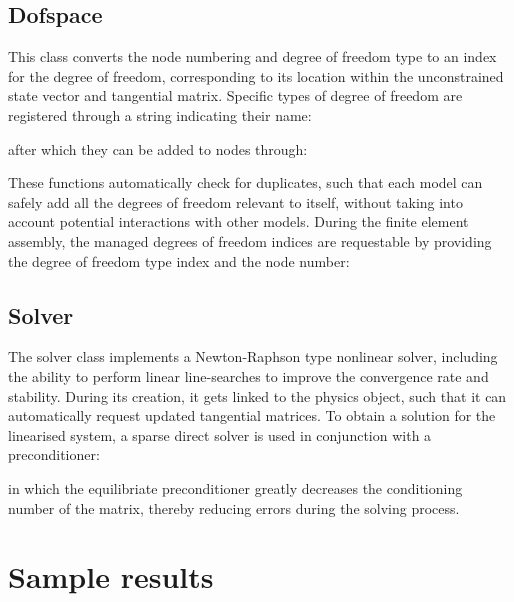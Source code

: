 \documentclass[3p]{elsarticle} %
\let\oldtodo\todo
\renewcommand{\todo}[1]{\oldtodo[inline]{#1}}
\begin{document}
\subsection{Dofspace}
This class converts the node numbering and degree of freedom type to an index for the degree of freedom, corresponding to its location within the unconstrained state vector and tangential matrix. Specific types of degree of freedom are registered through a string indicating their name:

after which they can be added to nodes through:

These functions automatically check for duplicates, such that each model can safely add all the degrees of freedom relevant to itself, without taking into account potential interactions with other models. During the finite element assembly, the managed degrees of freedom indices are requestable by providing the degree of freedom type index and the node number:


\subsection{Solver}
The solver class implements a Newton-Raphson type nonlinear solver, including the ability to perform linear line-searches to improve the convergence rate and stability. During its creation, it gets linked to the physics object, such that it can automatically request updated tangential matrices. To obtain a solution for the linearised system, a sparse direct solver is used in conjunction with a preconditioner:

in which the equilibriate preconditioner greatly decreases the conditioning number of the matrix, thereby reducing errors during the solving process. 


\section{Sample results}
\todo{Sample results}
\end{document}
